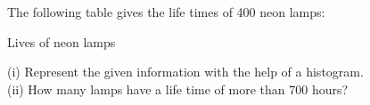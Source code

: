 The following table gives the life times of 400 neon lamps:\\
\begin{table}[ht!]
\centering

\caption{Lives of neon lamps}
\label{table:input_stat41}
\end{table}
(i) Represent the given information with the help of a histogram.\\
(ii) How many lamps have a life time of more than 700 hours?\\
